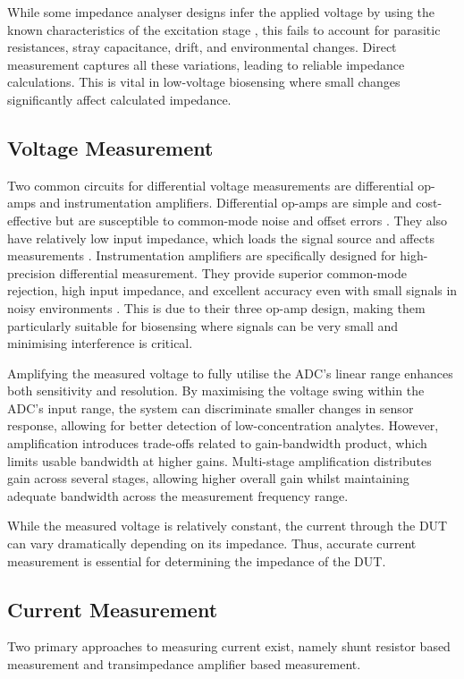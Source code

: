 While some impedance analyser designs infer the applied voltage by using the known characteristics of the excitation stage \cite{buscagliaSimpleZLowCostPortable2023}, this fails to account for parasitic resistances, stray capacitance, drift, and environmental changes. Direct measurement captures all these variations, leading to reliable impedance calculations. This is vital in low-voltage biosensing where small changes significantly affect calculated impedance.

\subsection{Voltage Measurement}\label{subsec:lit_review_v_meas}
Two common circuits for differential voltage measurements are differential op-amps and instrumentation amplifiers. Differential op-amps are simple and cost-effective but are susceptible to common-mode noise and offset errors \cite{technologyWhatAreDrawbacks2024}. They also have relatively low input impedance, which loads the signal source and affects measurements \cite{technologyWhatAreDrawbacks2024}. Instrumentation amplifiers are specifically designed for high-precision differential measurement. They provide superior common-mode rejection, high input impedance, and excellent accuracy even with small signals in noisy environments \cite{InstrumentationAmplifierOperational}. This is due to their three op-amp design, making them particularly suitable for biosensing where signals can be very small and minimising interference is critical.

Amplifying the measured voltage to fully utilise the \ac{ADC}'s linear range enhances both sensitivity and resolution. By maximising the voltage swing within the \ac{ADC}'s input range, the system can discriminate smaller changes in sensor response, allowing for better detection of low-concentration analytes. However, amplification introduces trade-offs related to gain-bandwidth product, which limits usable bandwidth at higher gains. Multi-stage amplification distributes gain across several stages, allowing higher overall gain whilst maintaining adequate bandwidth across the measurement frequency range.

While the measured voltage is relatively constant, the current through the \ac{DUT} can vary dramatically depending on its impedance. Thus, accurate current measurement is essential for determining the impedance of the \ac{DUT}.

\subsection{Current Measurement}
Two primary approaches to measuring current exist, namely shunt resistor based measurement and transimpedance amplifier based measurement.


